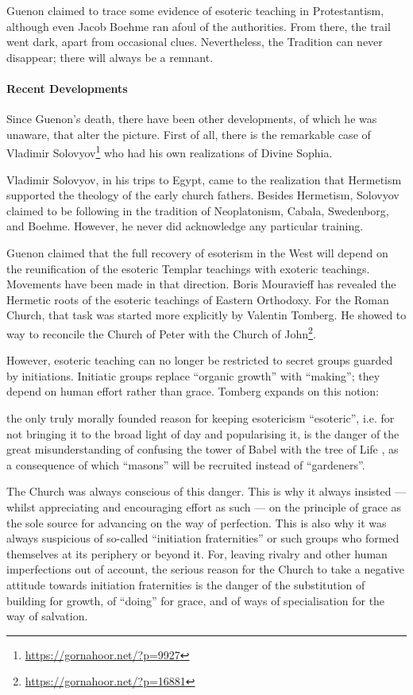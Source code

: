 Guenon claimed to trace some evidence of esoteric teaching in Protestantism, although even Jacob Boehme ran afoul of the authorities. From there, the trail went dark, apart from occasional clues. Nevertheless, the Tradition can never disappear; there will always be a remnant.

\paragraph{Recent Developments}


Since Guenon's death, there have been other developments, of which he was unaware, that alter the picture. First of all, there is the remarkable case of Vladimir Solovyov\footnote{\url{https://gornahoor.net/?p=9927}} who had his own realizations of Divine Sophia.

Vladimir Solovyov, in his trips to Egypt, came to the realization that Hermetism supported the theology of the early church fathers. Besides Hermetism, Solovyov claimed to be following in the tradition of Neoplatonism, Cabala, Swedenborg, and Boehme. However, he never did acknowledge any particular training.

Guenon claimed that the full recovery of esoterism in the West will depend on the reunification of the esoteric Templar teachings with exoteric teachings. Movements have been made in that direction. Boris Mouravieff has revealed the Hermetic roots of the esoteric teachings of Eastern Orthodoxy. For the Roman Church, that task was started more explicitly by Valentin Tomberg. He showed to way to reconcile the Church of Peter with the Church of John\footnote{\url{https://gornahoor.net/?p=16881}}.

However, esoteric teaching can no longer be restricted to secret groups guarded by initiations. Initiatic groups replace ``organic growth'' with ``making''; they depend on human effort rather than grace. Tomberg expands on this notion:

\begin{quotex}
the only truly morally founded reason for keeping esotericism ``esoteric'', i.e. for not bringing it to the broad light of day and popularising it, is the danger of the great misunderstanding of confusing the tower of Babel with the tree of Life , as a consequence of which ``masons'' will be recruited instead of ``gardeners''.

The Church was always conscious of this danger. This is why it always insisted --- whilst appreciating and encouraging effort as such --- on the principle of grace as the sole source for advancing on the way of perfection. This is also why it was always suspicious of so-called ``initiation fraternities'' or such groups who formed themselves at its periphery or beyond it. For, leaving rivalry and other human imperfections out of account, the serious reason for the Church to take a negative attitude towards initiation fraternities is the danger of the substitution of building for growth, of ``doing'' for grace, and of ways of specialisation for the way of salvation.
\end{quotex}

